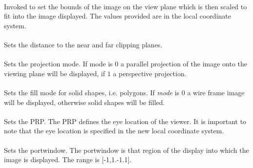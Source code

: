\\
Invoked to set the bounds of the image on the view plane which is then
scaled to fit into the image displayed. The values provided are in the
local coordinate system. \\

\\
Sets the distance to the near and far clipping planes. \\

\\ 
Sets the projection mode. If mode is $0$ a parallel projection of the
image onto the viewing plane will be displayed, if $1$ a perspective
projection. \\

\\
Sets the fill mode for solid shapes, i.e. polygons. If {\em mode} is
$0$ a wire frame image will be displayed, otherwise solid shapes will
be filled. \\

\\
Sets the PRP. The PRP defines the eye location of the viewer. It is
important to note that the eye location is specified in the new local
coordinate system. \\

\\ 
Sets the portwindow. The portwindow is that region of the display
into which the image is displayed. The range is [-1,1.-1.1]. \\